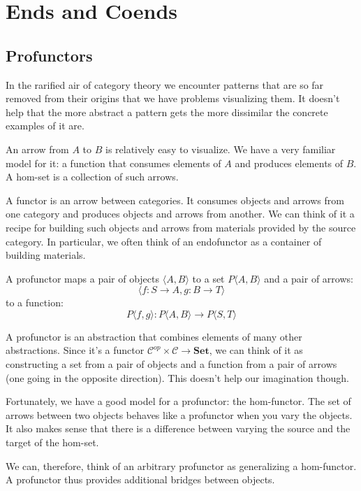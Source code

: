 \documentclass[DaoFP]{subfiles}
\begin{document}
\setcounter{chapter}{16}

\chapter{Ends and Coends}

\section{Profunctors}

In the rarified air of category theory we encounter patterns that are so far removed from their origins that we have problems visualizing them. It doesn't help that the more abstract a pattern gets the more dissimilar the concrete examples of it are. 

An arrow from $A$ to $B$ is relatively easy to visualize. We have a very familiar model for it: a function that consumes elements of $A$ and produces elements of $B$. A hom-set is a collection of such arrows. 

A functor is an arrow between categories. It consumes objects and arrows from one category and produces objects and arrows from another. We can think of it a recipe for building such objects and arrows from materials provided by the source category. In particular, we  often think of an endofunctor as a container of building materials.

A profunctor maps a pair of objects $\langle A, B \rangle$ to a set $P\langle A, B \rangle$ and a pair of arrows:
\[ \langle f \colon S \to A, g \colon B \to T \rangle \]
to a function:
\[ P\langle f, g \rangle \colon P\langle A, B \rangle \to P\langle S, T \rangle\]

A profunctor is an abstraction that combines elements of many other abstractions. Since it's a functor $ \mathcal{C}^{op} \times  \mathcal{C} \to \mathbf{Set}$, we can think of it as constructing a set from a pair of objects and a function from a pair of arrows (one going in the opposite direction). This doesn't help our imagination though.

Fortunately, we have a good model for a profunctor: the hom-functor. The set of arrows between two objects behaves like a profunctor when you vary the objects. It also makes sense that there is a difference between varying the source and the target of the hom-set. 

We can, therefore, think of an arbitrary profunctor as generalizing a hom-functor. A profunctor thus provides additional bridges between objects. 
\end{document}
